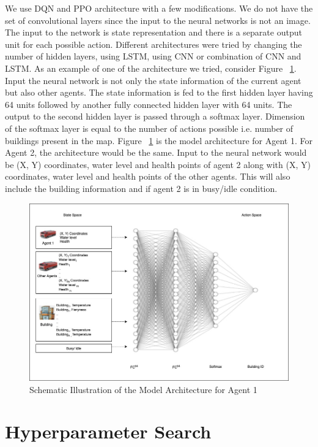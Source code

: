 \documentclass[12pt]{report}
\begin{document}
We use DQN and PPO architecture with a few modifications. We do not have the set of convolutional layers since the input to the neural networks is not an image. The input to the network is state representation and there is a separate output unit for each possible action. Different architectures were tried by changing the number of hidden layers, using LSTM, using CNN or combination of CNN and LSTM. As an example of one of the architecture we tried, consider Figure ~\ref{fig:27}. Input the neural network is not only the state information of the current agent but also other agents. The state information is fed to the first hidden layer having 64 units followed by another fully connected hidden layer with 64 units. The output to the second hidden layer is passed through a softmax layer. Dimension of the softmax layer is equal to the number of actions possible i.e. number of buildings present in the map. Figure ~\ref{fig:27} is the model architecture for Agent 1. For Agent 2, the architecture would be the same. Input to the neural network would be (X, Y) coordinates, water level and health points of agent 2 along with (X, Y) coordinates, water level and health points of the other agents. This will also include the building information and if agent 2 is in busy/idle condition. 

\begin{figure}[!h]
    \centering
    \includegraphics[width=16cm]{ModelArchi.jpg}
    \caption{Schematic Illustration of the Model Architecture for Agent 1}
    \label{fig:27}
\end{figure}

\section{Hyperparameter Search}
\end{document}
